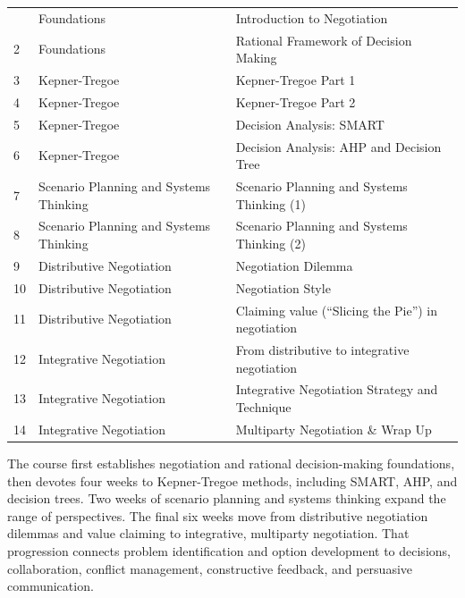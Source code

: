 \begin{tabularx}{\textwidth}{M{1.8cm}YY}&Foundations&Introduction to Negotiation\\
2&Foundations&Rational Framework of Decision Making\\
3&Kepner-Tregoe&Kepner-Tregoe Part 1\\
4&Kepner-Tregoe&Kepner-Tregoe Part 2\\
5&Kepner-Tregoe&Decision Analysis: SMART\\
6&Kepner-Tregoe&Decision Analysis: AHP and Decision Tree\\
7&Scenario Planning and Systems Thinking&Scenario Planning and Systems Thinking (1)\\
8&Scenario Planning and Systems Thinking&Scenario Planning and Systems Thinking (2)\\
9&Distributive Negotiation&Negotiation Dilemma\\
10&Distributive Negotiation&Negotiation Style\\
11&Distributive Negotiation&Claiming value (``Slicing the Pie'') in negotiation\\
12&Integrative Negotiation&From distributive to integrative negotiation\\
13&Integrative Negotiation&Integrative Negotiation Strategy and Technique\\
14&Integrative Negotiation&Multiparty Negotiation \& Wrap Up\\
\end{tabularx}
\begin{visualexplanation}
The course first establishes negotiation and rational decision-making foundations, then devotes four weeks to Kepner-Tregoe methods, including SMART, AHP, and decision trees. Two weeks of scenario planning and systems thinking expand the range of perspectives. The final six weeks move from distributive negotiation dilemmas and value claiming to integrative, multiparty negotiation. That progression connects problem identification and option development to decisions, collaboration, conflict management, constructive feedback, and persuasive communication.
\end{visualexplanation}

